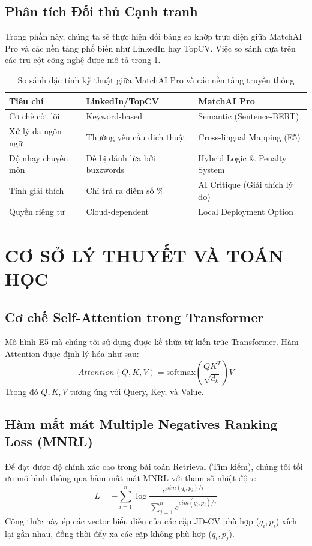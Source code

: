 \documentclass[12pt,a4paper,oneside]{report}
\begin{document}
\section{Phân tích Đối thủ Cạnh tranh}
Trong phần này, chúng ta sẽ thực hiện đối bảng so khớp trực diện giữa MatchAI Pro và các nền tảng phổ biến như LinkedIn hay TopCV. Việc so sánh dựa trên các trụ cột công nghệ được mô tả trong \cref{tab:competitor}.

\begin{table}[H]
\centering
\caption{So sánh đặc tính kỹ thuật giữa MatchAI Pro và các nền tảng truyền thống}
\label{tab:competitor}
\begin{tabular}{@{}lll@{}}
\toprule
\textbf{Tiêu chí} & \textbf{LinkedIn/TopCV} & \textbf{MatchAI Pro} \\ \midrule
Cơ chế cốt lõi & Keyword-based & Semantic (Sentence-BERT) \\
Xử lý đa ngôn ngữ & Thường yêu cầu dịch thuật & Cross-lingual Mapping (E5) \\
Độ nhạy chuyên môn & Dễ bị đánh lừa bởi buzzwords & Hybrid Logic \& Penalty System \\
Tính giải thích & Chỉ trả ra điểm số \% & AI Critique (Giải thích lý do) \\
Quyền riêng tư & Cloud-dependent & Local Deployment Option \\ \bottomrule
\end{tabular}
\end{table}

\chapter{CƠ SỞ LÝ THUYẾT VÀ TOÁN HỌC}
\label{ch:theory}

\section{Cơ chế Self-Attention trong Transformer}
Mô hình E5 mà chúng tôi sử dụng được kế thừa từ kiến trúc Transformer. Hàm Attention được định lý hóa như sau:
\begin{equation}
    Attention(Q, K, V) = \text{softmax}\left(\frac{QK^T}{\sqrt{d_k}}\right)V
\end{equation}
Trong đó $Q, K, V$ tương ứng với Query, Key, và Value.

\section{Hàm mất mát Multiple Negatives Ranking Loss (MNRL)}
Để đạt được độ chính xác cao trong bài toán Retrieval (Tìm kiếm), chúng tôi tối ưu mô hình thông qua hàm mất mát MNRL với tham số nhiệt độ $\tau$:
\begin{equation}
\label{eq:mnrl}
L = -\sum_{i=1}^{n} \log \frac{e^{sim(q_i, p_i) / \tau}}{\sum_{j=1}^{n} e^{sim(q_i, p_j) / \tau}}
\end{equation}
Công thức này ép các vector biểu diễn của các cặp JD-CV phù hợp ($q_i, p_i$) xích lại gần nhau, đồng thời đẩy xa các cặp không phù hợp ($q_i, p_j$).
\end{document}
